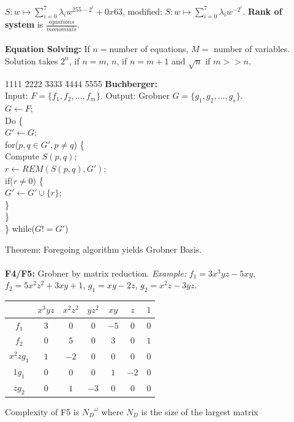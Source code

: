 $S: w \mapsto \sum_{i=0}^7 \lambda_i w^{255-2^i} +0x63$, modified: 
$S: w \mapsto \sum_{i=0}^7 \lambda_i w^{-2^i}$.
{\bf Rank of system} is ${\frac {equations} {monomials}}$.
\\
\\
{\bf Equation Solving:} If $n=$number of equations, $M=$ number of variables.  
Solution takes $2^n$, if $n=m$, $n$, if $n=m+1$ and ${\sqrt n}$ if $m>>n$.
\begin{tabbing}
1111 \= 2222 \= 3333 \= 4444 \= 5555 \kill
{\bf Buchberger:} \\
Input: $F= \{ f_1, f_2, \ldots , f_m \}$.
Output: Grobner $G= \{ g_1 , g_2 , \ldots , g_s \}$.
\\
$G \leftarrow F;$\\
Do \{ \\
    \> $G' \leftarrow G;$\\
    \> for($p,q\in G', p \ne q$) \{ \\
    \>   \> Compute $S(p,q)$; \\
    \>   \> $r \leftarrow REM(S(p,q), G')$; \\
    \>   \> if($r \ne 0$) \{ \\
    \>   \>     \> $G' \leftarrow G' \cup \{r\}$; \\
    \>   \>     \> \} \\
    \>   \> \} \\
    \> \} while($G!=G'$) \\
\end{tabbing}
Theorem:  Foregoing algorithm yields Grobner Basis.
\\
\\
{\bf F4/F5:}  Grobner by matrix reduction.  \emph{Example:} 
$f_1 = 3 x^3 y z -5xy$, $f_2 = 5x^2z^2+3xy+1$,
$g_1= xy-2z$, $g_2=x^2z-3yz$.
\begin{center}
\begin{tabular} {|c|cccccc|}
\hline
& $x^3yz$ & $x^2z^2$ & $yz^2$ & $xy$ & $z$ & $1$\\
\hline
$f_1$ & $3$ & $0$ & $0$ & $-5$ & $0$ & $0$ \\
$f_2$ & $0$ & $5$ & $0$ & $3$ & $0$ & $1$ \\
$x^2 z g_1$ & $1$ & $-2$ & $0$ & $0$ & $0$ & $0$ \\
$1 g_1$ & $0$ & $0$ & $0$ & $1$ & $-2$ & $0$ \\
$zg_2$ & $0$ & $1$ & $-3$ & $0$ & $0$ & $0$ \\
\hline
\end{tabular}
\end{center}
Complexity of F5 is ${N_D}^{\omega}$ where $N_D$ is the size of the largest matrix
